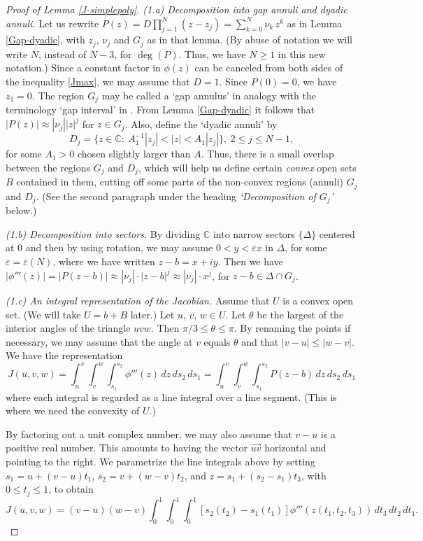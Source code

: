 \documentclass[11 pt]{amsart}
\theoremstyle{plain}
\numberwithin{equation}{section}
\theoremstyle{plain}
\numberwithin{equation}{section}
\theoremstyle{remark}
\begin{document}
\begin{proof}[Proof of Lemma \ref{J-simplepoly}]
{\sl (1.a) Decomposition into gap annuli and dyadic annuli.}
Let us rewrite $P(z) = D \prod_{j=1}^N (z-z_j) = \sum_{k=0}^N \nu_k \, z^k$ as in Lemma \ref{Gap-dyadic}, with $z_j$, $\nu_j$ and $G_j$ as in that lemma. (By abuse of notation we will write $N$, instead of $N-3$, for $\deg(P)$. Thus, we have $N\ge 1$ in this new notation.) Since a constant factor in $\phi(z)$ can be canceled from both sides of the inequality \eqref{Jmax}, we may assume that $D=1$. Since $P(0)=0$, we have $z_1=0$. The region $G_j$ may be called a `gap annulus' in analogy with the terminology `gap interval' in \cite{DeW}.
From Lemma \ref{Gap-dyadic} it follows that
$|P(z)| \approx |\nu_j| |z|^j$ for $z \in G_j$.
Also, define the `dyadic annuli' by
\[ D_j = \{ z\in {{\mathbb {C}}}: ~ A_1^{-1} |z_j| < |z| < A_1 |z_j|\}, ~ 2\le j\le N-1 ,
\]
for some $A_1 >0$ chosen slightly larger than $A$.
Thus, there is a small overlap between the regions $G_j$ and $D_j$, which will help us define certain {\it convex} open sets $B$ contained in them, cutting off some parts of the non-convex regions (annuli) $G_j$ and $D_j$. (See the second paragraph under the heading {\it `Decomposition of $G_j$'} below.)
\medskip

{\sl (1.b) Decomposition into sectors.}
By dividing ${{\mathbb {C}}}$ into narrow sectors $\{ \Delta\}$ centered at $0$ and then by using rotation, we may assume $0< y < {\varepsilon} x$ in $\Delta$, for some ${\varepsilon} = {\varepsilon}(N)$, where we have written $z - b =x+iy$.
Then we have $|\phi'''(z)| = |P(z-b)| \approx |\nu_j| \cdot |z-b|^j \approx |\nu_j| \cdot x^j$, for $z-b \in \Delta \cap G_j$.
\medskip

{\sl (1.c) An integral representation of the Jacobian.}
Assume that $U$ is a convex open set. (We will take $U=b+B$ later.) Let $u$, $v$, $w \in U$.
Let $\theta$ be the largest of the interior angles of the triangle $uvw$. Then $\pi/3 \le \theta \le \pi$. By renaming the points if necessary, we may assume that the angle at $v$ equals $\theta$ and that $|v-u| \le |w-v|$.
We have the representation
\begin{equation}\label{Jrep}
J (u, v, w) = \int_u^v \int_v^w \int_{s_1}^{s_2} \phi'''(z) \, dz\, ds_2 \,ds_1 = \int_u^v \int_v^w \int_{s_1}^{s_2} P(z-b) \, dz\, ds_2 \,ds_1
\end{equation}
where each integral is regarded as a line integral over a line segment. (This is where we need the convexity of $U$.)

By factoring out a unit complex number, we may also assume that $v-u$ is a positive real number. This amounts to having the vector $\overrightarrow{uv}$ horizontal and pointing to the right. We parametrize the line integrals above by setting $s_1 = u + (v-u) t_1$, $s_2 = v + (w-v) t_2$, and $z = s_1 + (s_2 - s_1) t_3$, with $0 \le t_j \le 1$, to obtain
\[ J (u, v, w) = (v-u) (w-v) \int_0^1 \int_0^1 \int_0^1 [s_2(t_2) -s_1 (t_1)] \phi'''(z (t_1, t_2, t_3)) \, dt_3 \, dt_2 \, dt_1 .
\]
\medskip


\end{proof}
\end{document}
